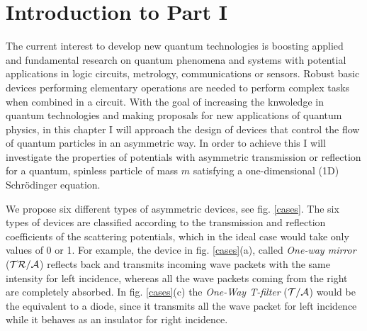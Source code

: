 
\chapter*{Introduction to Part I}
\label{IntroductionPartI}

The current interest to develop new quantum technologies is boosting applied
and fundamental research on quantum phenomena and systems with potential
applications in logic circuits, metrology, communications or sensors. Robust basic
devices performing elementary operations are needed to perform complex tasks
when combined in a circuit. With the goal of increasing the knwoledge in quantum technologies and making proposals for new applications of quantum physics, in this chapter I will approach the design of devices that control the flow of quantum particles in an asymmetric way. In order to achieve this I will investigate the properties of potentials with asymmetric
transmission or reflection for a quantum, spinless particle of mass $m$ satisfying a one-dimensional (1D) Schr\"odinger equation.

We propose six different types of asymmetric devices, see fig. \ref{cases}. The six types of devices are classified according to the transmission and reflection coefficients of the scattering potentials, which in the ideal case would take only values of 0 or 1. For example, the device in fig. \ref{cases}(a), called \textit{One-way mirror} ($\cal{TR/A}$) reflects back and transmits incoming wave packets with the same intensity for left incidence, whereas all the wave packets coming from the right are completely absorbed. In fig. \ref{cases}(c) the \textit{One-Way T-filter} ($\cal{T/A}$) would be the equivalent to a diode, since it transmits all the wave packet for left incidence while it behaves as an insulator for right incidence.

